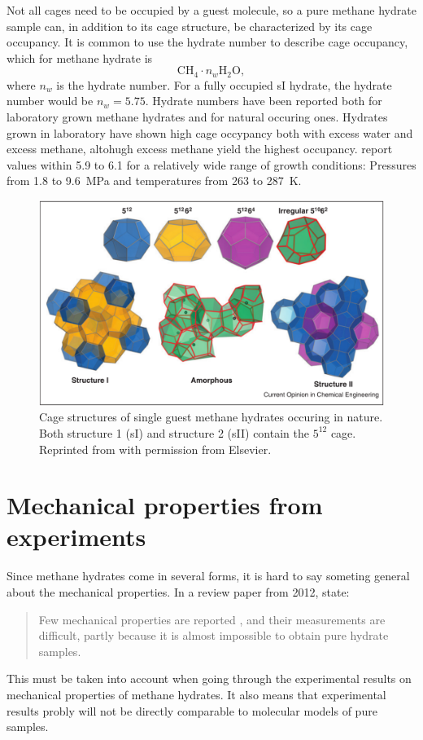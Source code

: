Not all cages need to be occupied by a guest molecule, so a pure methane hydrate sample can, in addition to its cage structure, be characterized by its cage occupancy. It is common to use the hydrate number to describe cage occupancy, which for methane hydrate is
%
\begin{equation}
	\mathrm{CH_4} \cdot n_w \mathrm{H_2O},
\end{equation}
%
where $n_w$ is the hydrate number. For a fully occupied sI hydrate, the hydrate number would be $n_w = 5.75$. Hydrate numbers have been reported both for laboratory grown methane hydrates and for natural occuring ones. Hydrates grown in laboratory have shown high cage occypancy both with excess water and excess methane, altohugh excess methane yield the highest occupancy. \citet{Circone2005} report values within 5.9 to 6.1 for a relatively wide range of growth conditions: Pressures from 1.8 to \SI{9.6}{\mega\pascal} and temperatures from 263 to \SI{287}{\kelvin}. 

\begin{figure}
\includegraphics[width=15cm]{../pictures/hydrate_structures.png}
\caption{Cage structures of single guest methane hydrates occuring in nature. Both structure 1 (sI) and structure 2 (sII) contain the $5^{12}$ cage. Reprinted from \citet{Barnes2013} with permission from Elsevier.}
\label{fig:methane_hydrate_structure}
\end{figure}


\section{Mechanical properties from experiments}
Since methane hydrates come in several forms, it is hard to say someting general about the mechanical properties. In a review paper from 2012, \citet{Ning2012} state:
\begin{quotation}
Few mechanical properties are reported , and their measurements are difficult, partly because it is almost impossible to obtain pure hydrate samples.
\end{quotation}
%
This must be taken into account when going through the experimental results on mechanical properties of methane hydrates. It also means that experimental results probly will not be directly comparable to molecular models of pure samples.

